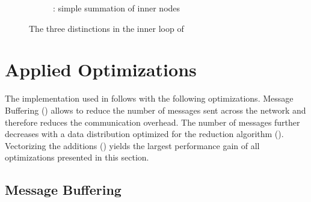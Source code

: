 \begin{figure}
\begin{subfigure}{0.32\textwidth}

\caption{: simple summation of inner nodes}
\label{fig:algoInnerNode}
\end{subfigure}
\caption{The three distinctions in the inner loop of }
\label{fig:algorithmCaseDistinction}
\end{figure}



\section{Applied Optimizations}
\label{sec:AppliedOptimizations}

The implementation used in  follows  with the following optimizations.
Message Buffering () allows to reduce the number of messages sent across the network and therefore reduces the communication overhead.
The number of messages further decreases with a data distribution optimized for the reduction algorithm ().
Vectorizing the additions () yields the largest performance gain of all optimizations presented in this section.

\subsection{Message Buffering}
\label{sec:MessageBuffering}

